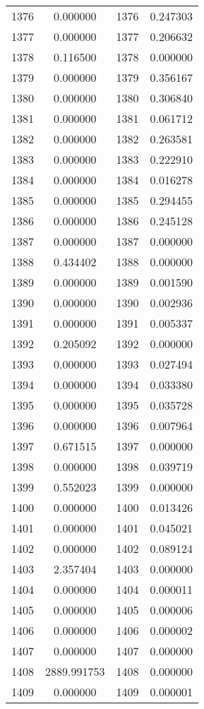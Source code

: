 \documentclass[12pt]{article}
\begin{document}
\begin{longtable}{@{}cccc@{}}
1376 & 0.000000 & 1376 & 0.247303 \\
1377 & 0.000000 & 1377 & 0.206632 \\
1378 & 0.116500 & 1378 & 0.000000 \\
1379 & 0.000000 & 1379 & 0.356167 \\
1380 & 0.000000 & 1380 & 0.306840 \\
1381 & 0.000000 & 1381 & 0.061712 \\
1382 & 0.000000 & 1382 & 0.263581 \\
1383 & 0.000000 & 1383 & 0.222910 \\
1384 & 0.000000 & 1384 & 0.016278 \\
1385 & 0.000000 & 1385 & 0.294455 \\
1386 & 0.000000 & 1386 & 0.245128 \\
1387 & 0.000000 & 1387 & 0.000000 \\
1388 & 0.434402 & 1388 & 0.000000 \\
1389 & 0.000000 & 1389 & 0.001590 \\
1390 & 0.000000 & 1390 & 0.002936 \\
1391 & 0.000000 & 1391 & 0.005337 \\
1392 & 0.205092 & 1392 & 0.000000 \\
1393 & 0.000000 & 1393 & 0.027494 \\
1394 & 0.000000 & 1394 & 0.033380 \\
1395 & 0.000000 & 1395 & 0.035728 \\
1396 & 0.000000 & 1396 & 0.007964 \\
1397 & 0.671515 & 1397 & 0.000000 \\
1398 & 0.000000 & 1398 & 0.039719 \\
1399 & 0.552023 & 1399 & 0.000000 \\
1400 & 0.000000 & 1400 & 0.013426 \\
1401 & 0.000000 & 1401 & 0.045021 \\
1402 & 0.000000 & 1402 & 0.089124 \\
1403 & 2.357404 & 1403 & 0.000000 \\
1404 & 0.000000 & 1404 & 0.000011 \\
1405 & 0.000000 & 1405 & 0.000006 \\
1406 & 0.000000 & 1406 & 0.000002 \\
1407 & 0.000000 & 1407 & 0.000000 \\
1408 & 2889.991753 & 1408 & 0.000000 \\
1409 & 0.000000 & 1409 & 0.000001 \\

\end{longtable}
\end{document}
